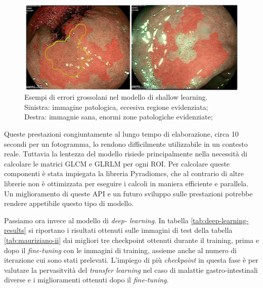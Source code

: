 \begin{figure}
    \includegraphics[width=\textwidth]{./assets/shallow-bad.png}
    \caption{\label{fig:shallow-bad}Esempi di errori grossolani
    nel modello di shallow learning.\\
    Sinistra: immagine patologica, eccesiva regione evidenziata; \\
    Destra: immagnie sana, enormi zone patologiche evidenziate;
    }
\end{figure}


Queste prestazioni congiuntamente al lungo
tempo di elaborazione, circa 10 secondi per un
fotogramma, lo rendono difficilmente utilizzabile
in un contesto reale.
Tuttavia la lentezza del modello risiede
principalmente nella necessità di calcolare
le matrici GLCM e GLRLM per ogni ROI.
Per calcolare queste componenti è
stata impiegata la libreria
Pyradiomcs\cite{radiomics}, che al contrario
di altre librerie non è ottimizzata per
eseguire i calcoli in maniera efficiente e 
parallela.
Un miglioramento di queste API e un futuro
sviluppo sulle prestazioni potrebbe
rendere appetibile questo tipo di
modello.

Passiamo ora invece al modello di {\it deep-
learning}.
In tabella \ref{tab:deep-learning-results}
si riportano i risultati ottenuti sulle
immagini di test della tabella
\ref{tab:mauriziano-ii} dai migliori tre
checkpoint ottenuti durante il training,
prima e dopo il {\it fine-tuning} con
le immagini di training, assieme anche
al numero di iterazione cui sono
stati prelevati.
L'impiego di più {\it checkpoint} in
questa fase è per valutare la pervasitvità
del {\it transfer learning} nel caso di
malattie gastro-intestinali diverse
e i miglioramenti ottenuti dopo il
{\it fine-tuning}.

